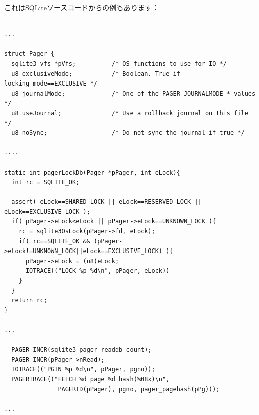 これはSQLiteソースコードからの例もあります：

\begin{lstlisting}

...

struct Pager {
  sqlite3_vfs *pVfs;          /* OS functions to use for IO */
  u8 exclusiveMode;           /* Boolean. True if locking_mode==EXCLUSIVE */
  u8 journalMode;             /* One of the PAGER_JOURNALMODE_* values */
  u8 useJournal;              /* Use a rollback journal on this file */
  u8 noSync;                  /* Do not sync the journal if true */

....

static int pagerLockDb(Pager *pPager, int eLock){
  int rc = SQLITE_OK;

  assert( eLock==SHARED_LOCK || eLock==RESERVED_LOCK || eLock==EXCLUSIVE_LOCK );
  if( pPager->eLock<eLock || pPager->eLock==UNKNOWN_LOCK ){
    rc = sqlite3OsLock(pPager->fd, eLock);
    if( rc==SQLITE_OK && (pPager->eLock!=UNKNOWN_LOCK||eLock==EXCLUSIVE_LOCK) ){
      pPager->eLock = (u8)eLock;
      IOTRACE(("LOCK %p %d\n", pPager, eLock))
    }
  }
  return rc;
}

...

  PAGER_INCR(sqlite3_pager_readdb_count);
  PAGER_INCR(pPager->nRead);
  IOTRACE(("PGIN %p %d\n", pPager, pgno));
  PAGERTRACE(("FETCH %d page %d hash(%08x)\n",
               PAGERID(pPager), pgno, pager_pagehash(pPg)));

...

\end{lstlisting}